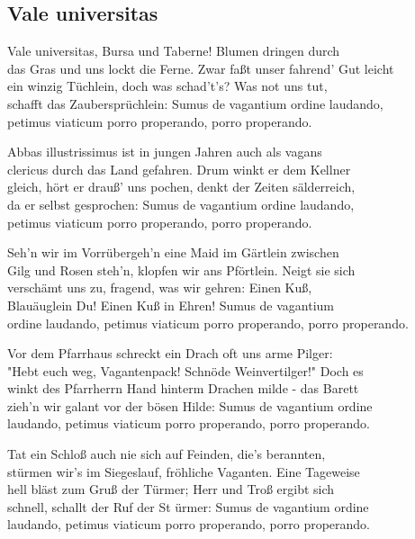 
\subsection*{Vale universitas}
%

\thestrophe Vale universitas, Bursa und Taberne! Blumen dringen durch \\
das Gras und uns lockt die Ferne. Zwar faßt unser fahrend' Gut leicht \\
ein winzig Tüchlein, doch was schad't's? Was not uns tut, \\
schafft das Zaubersprüchlein: Sumus de vagantium ordine laudando, \\
petimus viaticum porro properando, porro properando.

\thestrophe Abbas illustrissimus ist in jungen Jahren auch als vagans \\
clericus durch das Land gefahren. Drum winkt er dem Kellner \\
gleich, hört er drauß' uns pochen, denkt der Zeiten sälderreich, \\
da er selbst gesprochen: Sumus de vagantium ordine laudando, \\
petimus viaticum porro properando, porro properando.

\thestrophe Seh'n wir im Vorrübergeh'n eine Maid im Gärtlein zwischen \\
Gilg und Rosen steh'n, klopfen wir ans Pförtlein. Neigt sie sich \\
verschämt uns zu, fragend, was wir gehren: Einen Kuß, \\
Blauäuglein Du! Einen Kuß in Ehren! Sumus de vagantium \\
ordine laudando, petimus viaticum porro properando, porro properando.

\thestrophe Vor dem Pfarrhaus schreckt ein Drach oft uns arme Pilger: \\
"Hebt euch weg, Vagantenpack! Schnöde Weinvertilger!" Doch es \\
winkt des Pfarrherrn Hand hinterm Drachen milde - das Barett \\
zieh'n wir galant vor der bösen Hilde: Sumus de vagantium ordine \\
laudando, petimus viaticum porro properando, porro properando.

\thestrophe Tat ein Schloß auch nie sich auf Feinden, die's berannten, \\
stürmen wir's im Siegeslauf, fröhliche Vaganten. Eine Tageweise \\
hell bläst zum Gruß der Türmer; Herr und Troß ergibt sich \\
schnell, schallt der Ruf der St ürmer: Sumus de vagantium ordine \\
laudando, petimus viaticum porro properando, porro properando.

